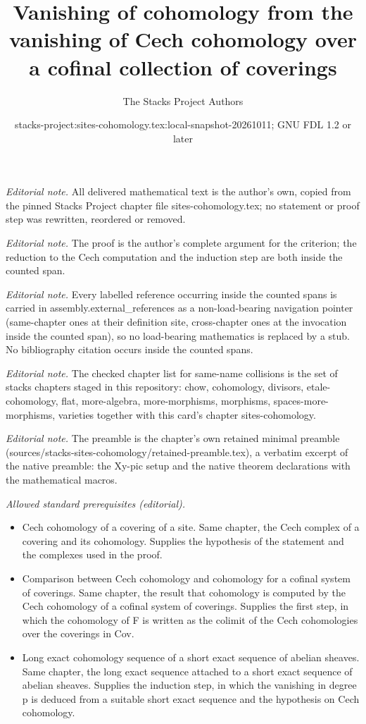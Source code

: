 \documentclass[10pt,a4paper]{amsart}
\title{Vanishing of cohomology from the vanishing of Cech cohomology over a cofinal collection of coverings}
\author{The Stacks Project Authors}
\date{stacks-project:sites-cohomology.tex:local-snapshot-20261011; GNU FDL 1.2 or later}
\theoremstyle{plain}
\theoremstyle{definition}
\theoremstyle{remark}
\numberwithin{equation}{subsection}
\begin{document}
\maketitle
\noindent\textit{Editorial note.} All delivered mathematical text is the author's own, copied from the pinned Stacks Project chapter file sites-cohomology.tex; no statement or proof step was rewritten, reordered or removed.\par\medskip
\noindent\textit{Editorial note.} The proof is the author's complete argument for the criterion; the reduction to the Cech computation and the induction step are both inside the counted span.\par\medskip
\noindent\textit{Editorial note.} Every labelled reference occurring inside the counted spans is carried in assembly.external\_references as a non-load-bearing navigation pointer (same-chapter ones at their definition site, cross-chapter ones at the invocation inside the counted span), so no load-bearing mathematics is replaced by a stub. No bibliography citation occurs inside the counted spans.\par\medskip
\noindent\textit{Editorial note.} The checked chapter list for same-name collisions is the set of stacks chapters staged in this repository: chow, cohomology, divisors, etale-cohomology, flat, more-algebra, more-morphisms, morphisms, spaces-more-morphisms, varieties together with this card's chapter sites-cohomology.\par\medskip
\noindent\textit{Editorial note.} The preamble is the chapter's own retained minimal preamble (sources/stacks-sites-cohomology/retained-preamble.tex), a verbatim excerpt of the native preamble: the Xy-pic setup and the native theorem declarations with the mathematical macros.\par\medskip
\noindent\textit{Allowed standard prerequisites (editorial).}\begin{itemize}
\item Cech cohomology of a covering of a site. Same chapter, the Cech complex of a covering and its cohomology. Supplies the hypothesis of the statement and the complexes used in the proof.
\item Comparison between Cech cohomology and cohomology for a cofinal system of coverings. Same chapter, the result that cohomology is computed by the Cech cohomology of a cofinal system of coverings. Supplies the first step, in which the cohomology of F is written as the colimit of the Cech cohomologies over the coverings in Cov.
\item Long exact cohomology sequence of a short exact sequence of abelian sheaves. Same chapter, the long exact sequence attached to a short exact sequence of abelian sheaves. Supplies the induction step, in which the vanishing in degree p is deduced from a suitable short exact sequence and the hypothesis on Cech cohomology.
\end{itemize}\medskip
\end{document}
